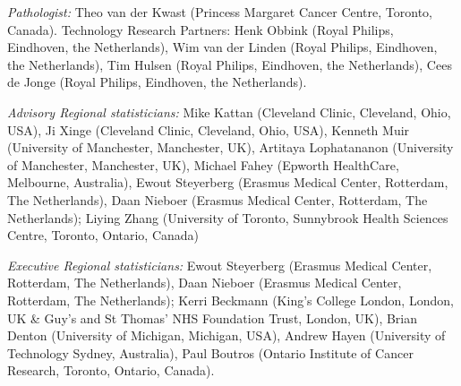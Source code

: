 \emph{Pathologist:} Theo van der Kwast (Princess Margaret Cancer Centre, Toronto, Canada). 
Technology Research Partners: Henk Obbink (Royal Philips, Eindhoven, the Netherlands), Wim van der Linden (Royal Philips, Eindhoven, the Netherlands), Tim Hulsen (Royal Philips, Eindhoven, the Netherlands), Cees de Jonge (Royal Philips, Eindhoven, the Netherlands).

\emph{Advisory Regional statisticians:} Mike Kattan (Cleveland Clinic, Cleveland, Ohio, USA), Ji Xinge (Cleveland Clinic, Cleveland, Ohio, USA), Kenneth Muir (University of Manchester, Manchester, UK), Artitaya Lophatananon (University of Manchester, Manchester, UK), Michael Fahey (Epworth HealthCare, Melbourne, Australia), Ewout Steyerberg (Erasmus Medical Center, Rotterdam, The Netherlands), Daan Nieboer (Erasmus Medical Center, Rotterdam, The Netherlands); Liying Zhang (University of Toronto, Sunnybrook Health Sciences Centre, Toronto, Ontario, Canada)

\emph{Executive Regional statisticians:} Ewout Steyerberg (Erasmus Medical Center, Rotterdam, The Netherlands), Daan Nieboer (Erasmus Medical Center, Rotterdam, The Netherlands); Kerri Beckmann (King's College London, London, UK \& Guy’s and St Thomas’ NHS Foundation Trust, London, UK), Brian Denton (University of Michigan, Michigan, USA), Andrew Hayen (University of Technology Sydney, Australia), Paul Boutros (Ontario Institute of Cancer Research, Toronto, Ontario, Canada).

